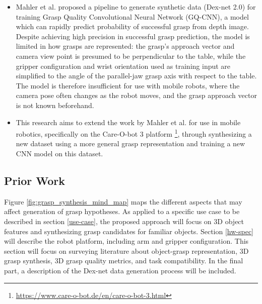 \documentclass[12pt]{article}
\begin{document}
\begin{itemize}
\begin{itemize}
        \end{itemize}
        \item Mahler et al. \cite{mahler2017} proposed a pipeline to generate synthetic data (Dex-net 2.0) for training Grasp Quality Convolutional Neural Network (GQ-CNN), a model which can rapidly predict probability of successful grasp from depth image. Despite achieving high precision in successful grasp prediction, the model is limited in how grasps are represented: the grasp's approach vector and camera view point is presumed to be perpendicular to the table, while the gripper configuration and wrist orientation used as training input are simplified to the angle of the parallel-jaw grasp axis with respect to the table. The model is therefore insufficient for use with mobile robots, where the camera pose often changes as the robot moves, and the grasp approach vector is not known beforehand.
        \item This research aims to extend the work by Mahler et al. \cite{mahler2017} for use in mobile robotics, specifically on the Care-O-bot 3 platform \footnote{\url{https://www.care-o-bot.de/en/care-o-bot-3.html}}, through synthesizing a new dataset using a more general grasp representation and training a new CNN model on this dataset.
    \end{itemize}

    \subsection{Prior Work}

    Figure \ref{fig:grasp_synthesis_mind_map} maps the different aspects that may affect generation of grasp hypotheses. As applied to a specific use case to be described in section \ref{use-case}, the proposed approach will focus on 3D object features and synthesizing grasp candidates for familiar objects. Section \ref{hw-spec} will describe the robot platform, including arm and gripper configuration. This section will focus on surveying literature about object-grasp representation, 3D grasp synthesis, 3D grasp quality metrics, and task compatibility. In the final part, a description of the Dex-net data generation process will be included.
\end{document}
